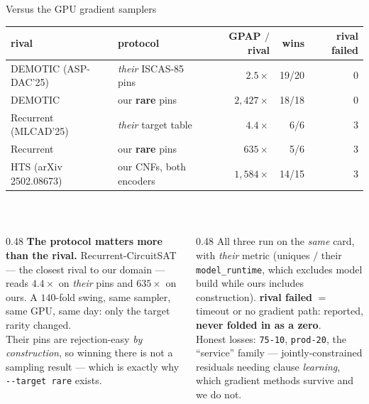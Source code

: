 \documentclass[aspectratio=169,11pt]{beamer}
\newcommand{\good}[1]{\textcolor{gpapgreen}{#1}}
\newcommand{\bad}[1]{\textcolor{gpapred}{#1}}
\newcommand{\rem}[1]{{\footnotesize\textcolor{gpapgray}{#1}}}
\newcommand{\keyw}[1]{\textcolor{gpapblue}{\textbf{#1}}}
\begin{document}
\begin{frame}{Versus the GPU gradient samplers}
  \centering
  \small
  \begin{tabular}{@{}llrrr@{}}
    \toprule
    rival & protocol & GPAP $/$ rival & wins & rival failed \\
    \midrule
    DEMOTIC \rem{(ASP-DAC'25)} & \emph{their} ISCAS-85 pins & $2.5\times$ & 19/20 & 0 \\
    DEMOTIC                    & our \keyw{rare} pins       & $2{,}427\times$ & 18/18 & 0 \\
    Recurrent \rem{(MLCAD'25)} & \emph{their} target table  & $4.4\times$ & 6/6 & 3 \\
    Recurrent                  & our \keyw{rare} pins       & \good{$635\times$} & 5/6 & 3 \\
    HTS \rem{(arXiv 2502.08673)} & our CNFs, both encoders  & $1{,}584\times$ & 14/15 & 3 \\
    \bottomrule
  \end{tabular}
  \\[1.0em]
  \begin{columns}[T]
    \begin{column}{0.48\textwidth}
      \keyw{\textbf{The protocol matters more than the rival.}} Recurrent-CircuitSAT --- the
      closest rival to our domain --- reads $4.4\times$ on \emph{their} pins and $635\times$ on
      ours. \bad{A $140$-fold swing}, same sampler, same GPU, same day: only the target rarity
      changed.
      \\[0.3em]
      \rem{Their pins are rejection-easy \emph{by construction}, so winning there is not a
      sampling result --- which is exactly why \texttt{-{}-target rare} exists.}
    \end{column}
    \begin{column}{0.48\textwidth}
      \rem{All three run on the \emph{same} card, with \emph{their} metric (uniques $/$ their
      \texttt{model\_runtime}, which excludes model build while ours includes construction).
      \keyw{rival failed} $=$ timeout or no gradient path: reported, \textbf{never folded in as a
      zero}.}
      \\[0.3em]
      \bad{Honest losses}: \texttt{75-10}, \texttt{prod-20}, the ``service'' family ---
      jointly-constrained residuals needing clause \emph{learning}, which gradient methods
      survive and we do not.
    \end{column}
  \end{columns}
\end{frame}
\end{document}
